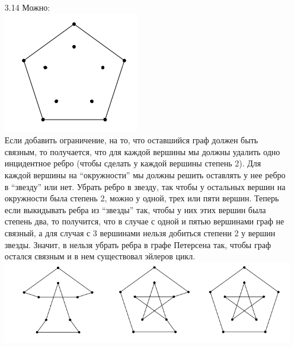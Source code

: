 \documentclass[10pt]{article}
\begin{document}
\begin{enumerate}
\item[3.14] Можно:\\
\includegraphics{3_14.png}\\
Если добавить ограничение, на то, что оставшийся граф должен быть связным, то получается, что для каждой вершины мы должны удалить одно инцидентное ребро (чтобы сделать у каждой вершины степень 2). Для каждой вершины на ``окружности'' мы должны решить оставлять у нее ребро в ``звезду'' или нет. Убрать ребро в звезду, так чтобы у остальных вершин на окружности была степень 2, можно у одной, трех или пяти вершин. Теперь если выкидывать ребра из ``звезды'' так, чтобы у них этих вершин была степень два, то получится, что в случае с одной и пятью вершинами граф не связный, а для случая с 3 вершинами нельзя добиться степени 2 у вершин звезды. Значит, в нельзя убрать ребра в графе Петерсена так, чтобы граф остался связным и в нем существовал эйлеров цикл.\\
\includegraphics{3_14_2.png}
\end{enumerate}
\end{document}
